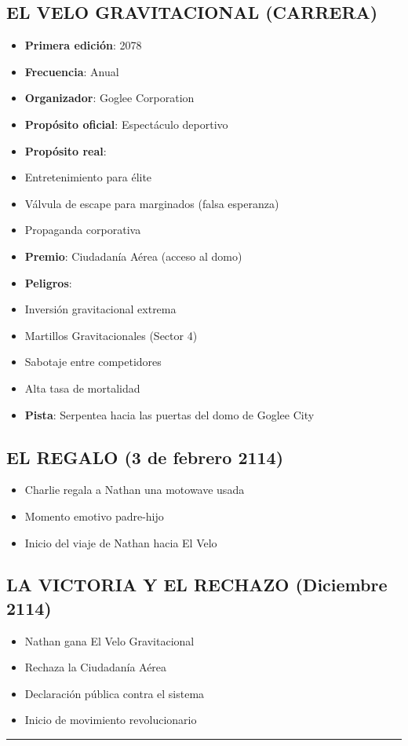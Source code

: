 \documentclass[11pt,a4paper]{report}
\begin{document}
\subsection{EL VELO GRAVITACIONAL (CARRERA)}
\begin{itemize}
  \item \textbf{Primera edición}: 2078
  \item \textbf{Frecuencia}: Anual
  \item \textbf{Organizador}: Goglee Corporation
  \item \textbf{Propósito oficial}: Espectáculo deportivo
  \item \textbf{Propósito real}: 
  \item Entretenimiento para élite
  \item Válvula de escape para marginados (falsa esperanza)
  \item Propaganda corporativa
  \item \textbf{Premio}: Ciudadanía Aérea (acceso al domo)
  \item \textbf{Peligros}:
  \item Inversión gravitacional extrema
  \item Martillos Gravitacionales (Sector 4)
  \item Sabotaje entre competidores
  \item Alta tasa de mortalidad
  \item \textbf{Pista}: Serpentea hacia las puertas del domo de Goglee City

\end{itemize}
\subsection{EL REGALO (3 de febrero 2114)}
\begin{itemize}
  \item Charlie regala a Nathan una motowave usada
  \item Momento emotivo padre-hijo
  \item Inicio del viaje de Nathan hacia El Velo

\end{itemize}
\subsection{LA VICTORIA Y EL RECHAZO (Diciembre 2114)}
\begin{itemize}
  \item Nathan gana El Velo Gravitacional
  \item Rechaza la Ciudadanía Aérea
  \item Declaración pública contra el sistema
  \item Inicio de movimiento revolucionario

\end{itemize}
\bigskip\hrule\bigskip
\end{document}
